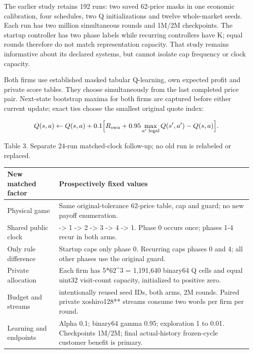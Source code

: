 \documentclass[a4paper,10pt]{article}
\newcommand{\reportheading}[1]{\par\vspace{5pt}{\large\bfseries\color{ink}#1}\par\vspace{2pt}}
\newcommand{\reportcaption}[1]{{\fontsize{8.4}{10.2}\selectfont #1\par}\vspace{3pt}}
\begin{document}
\clearpage


\reportheading{5 Controlled learning comparisons}

The earlier study retains 192 runs: two saved 62-price masks in one economic calibration, four schedules, two Q initializations and twelve whole-market seeds. Each run has two million simultaneous rounds and 1M/2M checkpoints. The startup controller has two phase labels while recurring controllers have K; equal rounds therefore do not match representation capacity. That study remains informative about its declared systems, but cannot isolate cap frequency or clock capacity.
\par

Both firms use established masked tabular Q-learning, own expected profit and private score tables. They choose simultaneously from the last completed price pair. Next-state bootstrap maxima for both firms are captured before either current update; exact ties choose the smallest original quote index:
\par

\[Q(s,a)\leftarrow Q(s,a)+0.1\Bigl[R_{\rm own}+0.95\max_{a'\text{ legal}}Q(s',a')-Q(s,a)\Bigr].\]

\reportcaption{Table 3. Separate 24-run matched-clock follow-up; no old run is relabeled or replaced.}

{\fontsize{9}{10.8}\selectfont\noindent\begin{tabular}{@{}>{\raggedright\arraybackslash}p{0.2179226\dimexpr\linewidth-16pt\relax}>{\raggedright\arraybackslash}p{0.7820774\dimexpr\linewidth-16pt\relax}@{}}\toprule
\textbf{New matched factor} & \textbf{Prospectively fixed values}\\\midrule
Physical game & Same original-tolerance 62-price table, cap and guard; no new payoff enumeration.\\
Shared public clock & 0 -> 1 -> 2 -> 3 -> 4 -> 1. Phase 0 occurs once; phases 1-4 recur in both arms.\\
Only rule difference & Startup caps only phase 0. Recurring caps phases 0 and 4; all other phases use the original guard.\\
Private allocation & Each firm has 5*62\textasciicircum{}3 = 1,191,640 binary64 Q cells and equal uint32 visit-count capacity, initialized to positive zero.\\
Budget and streams & 12 intentionally reused seed IDs, both arms, 2M rounds. Paired private xoshiro128** streams consume two words per firm per round.\\
Learning and endpoints & Alpha 0.1; binary64 gamma 0.95; exploration 1 to 0.01. Checkpoints 1M/2M; final actual-history frozen-cycle customer benefit is primary.\\
\bottomrule\end{tabular}\par}\vspace{3pt}
\end{document}
